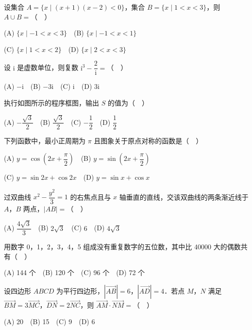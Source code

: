 \begin{question}
设集合 \(A=\{x\mid (x+1)(x-2)<0\}\)，集合 \(B=\{x\mid 1<x<3\}\)，则 \(A\cup B=\)（　）

(A) \(\{x\mid -1<x<3\}\)　(B) \(\{x\mid -1<x<1\}\)

(C) \(\{x\mid 1<x<2\}\)　(D) \(\{x\mid 2<x<3\}\)

\end{question}
\begin{question}
设 \(\mathrm{i}\) 是虚数单位，则复数 \(\mathrm{i}^3-\dfrac{2}{\mathrm{i}}=\)（　）

(A) \(-\mathrm{i}\)　(B) \(-3\mathrm{i}\)　(C) \(\mathrm{i}\)　(D) \(3\mathrm{i}\)

\Needspace{0.4\textheight}
\end{question}
\begin{question}
执行如图所示的程序框图，输出 \(S\) 的值为（　）
\nopagebreak[4]
\begin{center}\end{center}
\nopagebreak[4]
(A) \(-\dfrac{\sqrt{3}}{2}\)　(B) \(\dfrac{\sqrt{3}}{2}\)　(C) \(-\dfrac{1}{2}\)　(D) \(\dfrac{1}{2}\)

\end{question}
\begin{question}
下列函数中，最小正周期为 \(\pi\) 且图象关于原点对称的函数是（　）

(A) \(y=\cos\left(2x+\dfrac{\pi}{2}\right)\)　(B) \(y=\sin\left(2x+\dfrac{\pi}{2}\right)\)

(C) \(y=\sin 2x+\cos 2x\)　(D) \(y=\sin x+\cos x\)

\end{question}
\begin{question}
过双曲线 \(x^2-\dfrac{y^2}{3}=1\) 的右焦点且与 \(x\) 轴垂直的直线，交该双曲线的两条渐近线于 \(A\)，\(B\) 两点，\(|AB| =\)（　）

(A) \(\dfrac{4\sqrt{3}}{3}\)　(B) \(2\sqrt{3}\)　(C) \(6\)　(D) \(4\sqrt{3}\)

\end{question}
\begin{question}
用数字 0，1，2，3，4，5 组成没有重复数字的五位数，其中比 40000 大的偶数共有（　）

(A) 144 个　(B) 120 个　(C) 96 个　(D) 72 个

\end{question}
\begin{question}
设四边形 \(ABCD\) 为平行四边形，\(\left|\overrightarrow{AB}\right|=6\)，\(\left|\overrightarrow{AD}\right|=4\)．若点 \(M\)，\(N\) 满足 \(\overrightarrow{BM}=3\overrightarrow{MC}\)，\(\overrightarrow{DN}=2\overrightarrow{NC}\)，则 \(\overrightarrow{AM}\cdot\overrightarrow{NM}=\)（　）

(A) 20　(B) 15　(C) 9　(D) 6

\end{question}
